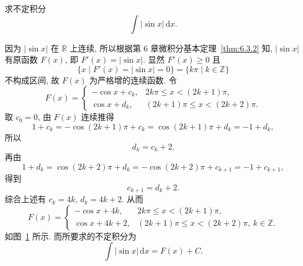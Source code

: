 \begin{example}\label{ex:5.1.7}
求不定积分
\[
\int|\sin x|\,\mathrm{d}x.
\]
\end{example}

\begin{solution}
因为 $|\sin x|$ 在 $\mathbb{R}$ 上连续, 所以根据第 6 章微积分基本定理~\ref{thm:6.3.2} 知, $|\sin x|$ 有原函数 $F(x)$, 即 $F'(x)=|\sin x|$. 显然 $F'(x)\geqslant 0$ 且
\[
\{x\mid F'(x)=|\sin x|=0\}=\{k\pi\mid k\in\mathbb{Z}\}
\]
不构成区间, 故 $F(x)$ 为严格增的连续函数. 令
\[
F(x)=
\begin{cases}
-\cos x+c_{k}, & 2k\pi\leqslant x<(2k+1)\pi,\\
\cos x+d_{k}, & (2k+1)\pi\leqslant x<(2k+2)\pi.
\end{cases}
\]
取 $c_{0}=0$, 由 $F(x)$ 连续推得
\[
1+c_{k}=-\cos(2k+1)\pi+c_{k}=\cos(2k+1)\pi+d_{k}=-1+d_{k},
\]
所以
\[
d_{k}=c_{k}+2.
\]
再由
\[
1+d_{k}=\cos(2k+2)\pi+d_{k}=-\cos(2k+2)\pi+c_{k+1}=-1+c_{k+1},
\]
得到
\[
c_{k+1}=d_{k}+2.
\]
综合上述有 $c_{k}=4k$, $d_{k}=4k+2$. 从而
\[
F(x)=
\begin{cases}
-\cos x+4k, & 2k\pi\leqslant x<(2k+1)\pi,\\
\cos x+4k+2, & (2k+1)\pi\leqslant x<(2k+2)\pi,\ k\in\mathbb{Z}.
\end{cases}
\]
如图~\ref{fig:5.1.4} 所示. 而所要求的不定积分为
\[
\int|\sin x|\,\mathrm{d}x=F(x)+C.
\]
\end{solution}

\begin{figure}[htbp]
\centering
{}
\caption{}\label{fig:5.1.4}
\end{figure}

